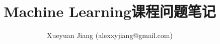\documentclass[UTF8]{ctexart}
\begin{document}
\title{Machine Learning课程问题笔记}
\author{Xueyuan Jiang (alexxyjiang@gmail.com)}
\date{}
\maketitle
\pagestyle{plain}

\end{document}
